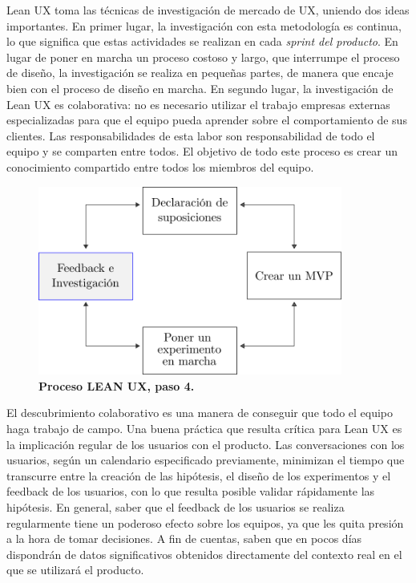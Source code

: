 Lean UX toma las técnicas de investigación de mercado de UX, uniendo dos ideas importantes. En primer lugar, la investigación con esta metodología es continua, lo que significa que estas actividades se realizan en cada \textit{sprint del producto}. En lugar de poner en marcha un proceso costoso y largo, que interrumpe el proceso de diseño, la investigación se realiza en pequeñas partes, de manera que encaje bien con el proceso de diseño en marcha. En segundo lugar, la investigación de Lean UX es colaborativa: no es necesario utilizar el trabajo empresas externas especializadas para que el equipo pueda aprender sobre el comportamiento de sus clientes. Las responsabilidades de esta labor son responsabilidad de todo el equipo y se comparten entre todos. El objetivo de todo este proceso es crear un conocimiento compartido entre todos los miembros del equipo. 

\begin{figure}[h]
\includegraphics[width=10cm]{Img/Desarrollo/desarrollo4.png}
\centering
\caption{\textbf{ \footnotesize{Proceso LEAN UX, paso 4. }}}
\end{figure}
\label{fig:leanux4}

\clearpage
El descubrimiento colaborativo es una manera de conseguir que todo el equipo haga trabajo de campo. Una buena práctica que resulta crítica para Lean UX es la implicación regular de los usuarios con el producto. Las conversaciones con los usuarios, según un calendario especificado previamente, minimizan el tiempo que transcurre entre la creación de las hipótesis, el diseño de los experimentos y el feedback de los usuarios, con lo que resulta posible validar rápidamente las hipótesis. En general, saber que el feedback de los usuarios se realiza regularmente tiene un poderoso efecto sobre los equipos, ya que les quita presión a la hora de tomar decisiones. A fin de cuentas, saben que en pocos días dispondrán de datos significativos obtenidos directamente del contexto real en el que se utilizará el producto.


